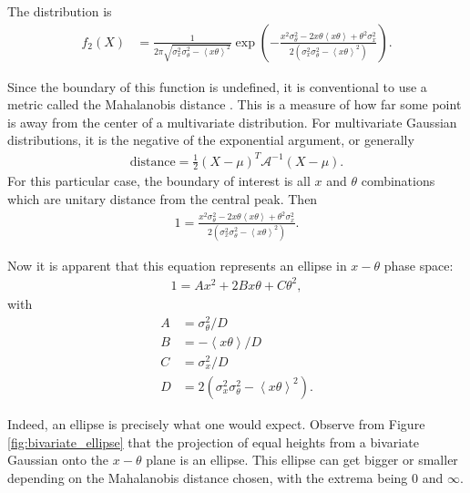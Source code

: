 The distribution is
\begin{align*}
f_2(X)&=\frac{1}{2\pi\sqrt{\sigma_x^2\sigma_\theta^2-\left<x\theta\right>^2}}\exp\left(-\frac{x^2\sigma_\theta^2-2x\theta\left<x\theta\right>+\theta^2\sigma_x^2}{2(\sigma_x^2\sigma_\theta^2-\left<x\theta\right>^2)}\right).
\end{align*}

Since the boundary of this function is undefined, it is conventional to use a metric called the Mahalanobis distance \cite{mahalanobis}. This is a measure of how far some point is away from the center of a multivariate distribution. For multivariate Gaussian distributions, it is the negative of the exponential argument, or generally
\begin{align*}
\text{distance}=\frac{1}{2}(X-\mu)^T\mathcal{A}^{-1}(X-\mu).
\end{align*} 
For this particular case, the boundary of interest is all $x$ and $\theta$ combinations which are unitary distance from the central peak. Then
\begin{align*}
1=\frac{x^2\sigma_\theta^2-2x\theta\left<x\theta\right>+\theta^2\sigma_x^2}{2(\sigma_x^2\sigma_\theta^2-\left<x\theta\right>^2)}.
\end{align*}

Now it is apparent that this equation represents an ellipse in $x-\theta$ phase space:
\begin{align} \label{eqn:ellipse}
1=Ax^2+2Bx\theta+C\theta^2,
\end{align}
with
\begin{align*}
A&=\sigma_\theta^2/D\\
B&=-\left<x\theta\right>/D\\
C&=\sigma_x^2/D\\
D&=2(\sigma_x ^2 \sigma_\theta^2 - \left<x\theta\right>^2).
\end{align*}

Indeed, an ellipse is precisely what one would expect. Observe from Figure \ref{fig:bivariate_ellipse} that the projection of equal heights from a bivariate Gaussian onto the $x-\theta$ plane is an ellipse. This ellipse can get bigger or smaller depending on the Mahalanobis distance chosen, with the extrema being 0 and $\infty$.

